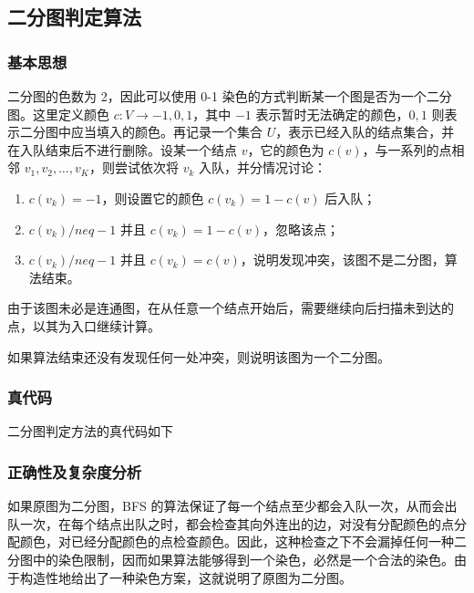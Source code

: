 \documentclass[UTF8]{ctexart}
\begin{document}
    \subsection{二分图判定算法}

        \subsubsection{基本思想}

        二分图的色数为 2，因此可以使用 0-1 染色的方式判断某一个图是否为一个二分图。这里定义颜色 $c: V\to {-1, 0, 1}$，其中 $-1$ 表示暂时无法确定的颜色，$0, 1$ 则表示二分图中应当填入的颜色。再记录一个集合 $U$，表示已经入队的结点集合，并在入队结束后不进行删除。设某一个结点 $v$，它的颜色为 $c(v)$，与一系列的点相邻 $v_1, v_2, \dots, v_K$，则尝试依次将 $v_k$ 入队，并分情况讨论：

        \begin{enumerate}
            \item $c(v_k) = -1$，则设置它的颜色 $c(v_k) = 1-c(v)$ 后入队；
            \item $c(v_k) /neq -1$ 并且 $c(v_k) = 1-c(v)$，忽略该点；
            \item $c(v_k) /neq -1$ 并且 $c(v_k) = c(v)$，说明发现冲突，该图不是二分图，算法结束。
        \end{enumerate}

        由于该图未必是连通图，在从任意一个结点开始后，需要继续向后扫描未到达的点，以其为入口继续计算。

        如果算法结束还没有发现任何一处冲突，则说明该图为一个二分图。

        \subsubsection{真代码}

        二分图判定方法的真代码如下 

        \subsubsection{正确性及复杂度分析}

        如果原图为二分图，BFS 的算法保证了每一个结点至少都会入队一次，从而会出队一次，在每个结点出队之时，都会检查其向外连出的边，对没有分配颜色的点分配颜色，对已经分配颜色的点检查颜色。因此，这种检查之下不会漏掉任何一种二分图中的染色限制，因而如果算法能够得到一个染色，必然是一个合法的染色。由于构造性地给出了一种染色方案，这就说明了原图为二分图。
\end{document}
